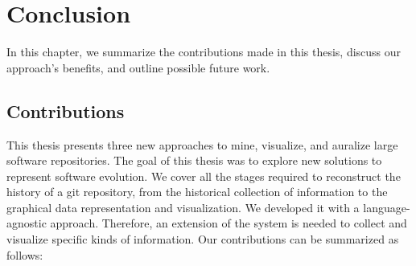 \chapter{Conclusion}
In this chapter, we summarize the contributions made in this thesis, discuss our approach's benefits, and outline possible future work.

\section{Contributions}
This thesis presents three new approaches to mine, visualize, and auralize large software repositories. The goal of this thesis was to explore new solutions to represent software evolution. We cover all the stages required to reconstruct the history of a git repository, from the historical collection of information to the graphical data representation and visualization. We developed it with a language-agnostic approach. Therefore, an extension of the system is needed to collect and visualize specific kinds of information. Our contributions can be summarized as follows:
